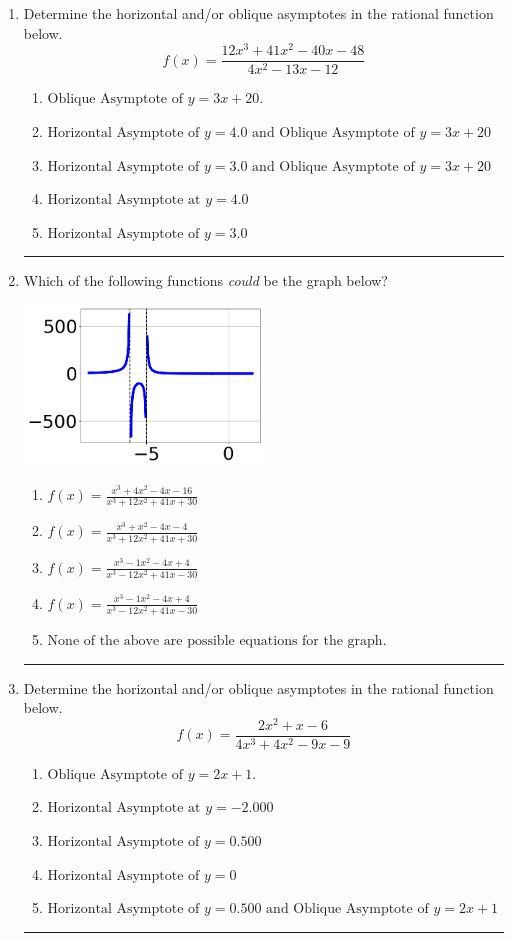 \documentclass[14pt]{extbook}
\newcommand{\litem}[1]{\item#1\hspace*{-1cm}\rule{\textwidth}{0.4pt}}
\begin{document}
\begin{enumerate}
\litem{
Determine the horizontal and/or oblique asymptotes in the rational function below.\[ f(x) = \frac{12x^{3} +41 x^{2} -40 x -48}{4x^{2} -13 x -12} \]\begin{enumerate}[label=\Alph*.]
\item \( \text{Oblique Asymptote of } y = 3x + 20. \)
\item \( \text{Horizontal Asymptote of } y = 4.0 \text{ and Oblique Asymptote of } y = 3x + 20 \)
\item \( \text{Horizontal Asymptote of } y = 3.0 \text{ and Oblique Asymptote of } y = 3x + 20 \)
\item \( \text{Horizontal Asymptote at } y = 4.0 \)
\item \( \text{Horizontal Asymptote of } y = 3.0  \)

\end{enumerate} }
\litem{
Which of the following functions \textit{could} be the graph below?
\begin{center}
    \includegraphics[width=0.5\textwidth]{../Figures/identifyGraphOfRationalFunctionB.png}
\end{center}
\begin{enumerate}[label=\Alph*.]
\item \( f(x)=\frac{x^{3} +4 x^{2} -4 x -16}{x^{3} +12 x^{2} +41 x + 30} \)
\item \( f(x)=\frac{x^{3} + x^{2} -4 x -4}{x^{3} +12 x^{2} +41 x + 30} \)
\item \( f(x)=\frac{x^{3} -1 x^{2} -4 x + 4}{x^{3} -12 x^{2} +41 x -30} \)
\item \( f(x)=\frac{x^{3} -1 x^{2} -4 x + 4}{x^{3} -12 x^{2} +41 x -30} \)
\item \( \text{None of the above are possible equations for the graph.} \)

\end{enumerate} }
\litem{
Determine the horizontal and/or oblique asymptotes in the rational function below.\[ f(x) = \frac{2x^{2} +x -6}{4x^{3} +4 x^{2} -9 x -9} \]\begin{enumerate}[label=\Alph*.]
\item \( \text{Oblique Asymptote of } y = 2x + 1. \)
\item \( \text{Horizontal Asymptote at } y = -2.000 \)
\item \( \text{Horizontal Asymptote of } y = 0.500  \)
\item \( \text{Horizontal Asymptote of } y = 0 \)
\item \( \text{Horizontal Asymptote of } y = 0.500 \text{ and Oblique Asymptote of } y = 2x + 1 \)


\end{enumerate}}
\end{enumerate}
\end{document}
